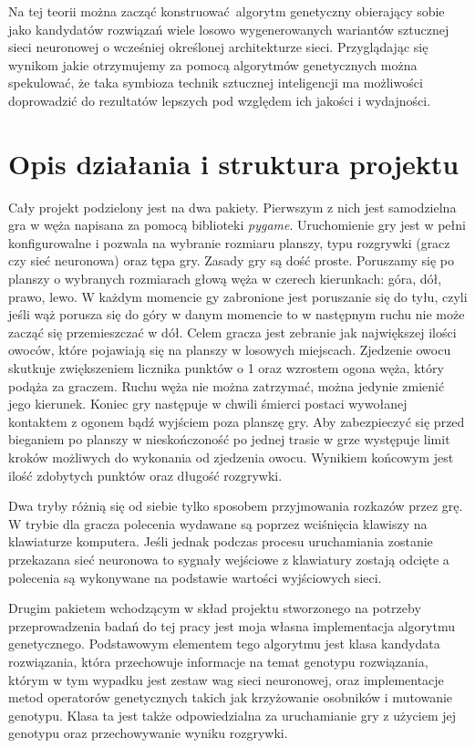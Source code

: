 \documentclass[12pt, oneside, a4paper]{report}
\begin{document}
Na tej teorii można zacząć konstruować algorytm genetyczny obierający sobie jako kandydatów rozwiązań wiele losowo wygenerowanych wariantów sztucznej sieci neuronowej o wcześniej określonej architekturze sieci. Przyglądając się wynikom jakie otrzymujemy za pomocą algorytmów genetycznych można spekulować, że taka symbioza technik sztucznej inteligencji ma możliwości doprowadzić do rezultatów lepszych pod względem ich jakości i wydajności.

\section{Opis działania i struktura projektu}

Cały projekt podzielony jest na dwa pakiety. Pierwszym z nich jest samodzielna gra w węża napisana za pomocą biblioteki \textit{pygame}. Uruchomienie gry jest w pełni konfigurowalne i pozwala na wybranie rozmiaru planszy, typu rozgrywki (gracz czy sieć neuronowa) oraz tępa gry. Zasady gry są dość proste. Poruszamy się po planszy o wybranych rozmiarach głową węża w czerech kierunkach: góra, dół, prawo, lewo. W każdym momencie gy zabronione jest poruszanie się do tyłu, czyli jeśli wąż porusza się do góry w danym momencie to w następnym ruchu nie może zacząć się przemieszczać w dół. Celem gracza jest zebranie jak największej ilości owoców, które pojawiają się na planszy w losowych miejscach. Zjedzenie owocu skutkuje zwiększeniem licznika punktów o 1 oraz wzrostem ogona węża, który podąża za graczem. Ruchu węża nie można zatrzymać, można jedynie zmienić jego kierunek. Koniec gry następuje w chwili śmierci postaci wywołanej kontaktem z ogonem bądź wyjściem poza planszę gry. Aby zabezpieczyć się przed bieganiem po planszy w nieskończoność po jednej trasie w grze występuje limit kroków możliwych do wykonania od zjedzenia owocu. Wynikiem końcowym jest ilość zdobytych punktów oraz długość rozgrywki.

Dwa tryby różnią się od siebie tylko sposobem przyjmowania rozkazów przez grę. W trybie dla gracza polecenia wydawane są poprzez wciśnięcia klawiszy na klawiaturze komputera. Jeśli jednak podczas procesu uruchamiania zostanie przekazana sieć neuronowa to sygnały wejściowe z klawiatury zostają odcięte a polecenia są wykonywane na podstawie wartości wyjściowych sieci.

Drugim pakietem wchodzącym w skład projektu stworzonego na potrzeby przeprowadzenia badań do tej pracy jest moja własna implementacja algorytmu genetycznego. Podstawowym elementem tego algorytmu jest klasa kandydata rozwiązania, która przechowuje informacje na temat genotypu rozwiązania, którym w tym wypadku jest zestaw wag sieci neuronowej, oraz implementacje metod operatorów genetycznych takich jak krzyżowanie osobników i mutowanie genotypu. Klasa ta jest także odpowiedzialna za uruchamianie gry z użyciem jej genotypu oraz przechowywanie wyniku rozgrywki.
\end{document}
